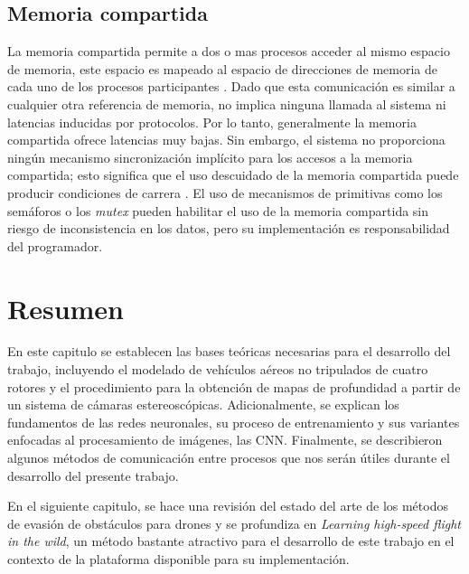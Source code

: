 \subsection{Memoria compartida}

La memoria compartida permite a dos o mas procesos acceder al mismo espacio de memoria, este espacio es mapeado al espacio de direcciones de memoria de cada uno de los procesos participantes \cite{IPCEval2015}. Dado que esta comunicación es similar a cualquier otra referencia de memoria, no implica ninguna llamada al sistema ni latencias inducidas por protocolos. Por lo tanto, generalmente la memoria compartida ofrece latencias muy bajas. Sin embargo, el sistema no proporciona ningún mecanismo sincronización implícito para los accesos a la memoria compartida; esto significa que el uso descuidado de la memoria compartida puede producir condiciones de carrera \cite{IPCEval2015}. El uso de mecanismos de primitivas como los semáforos o los \textit{mutex} pueden habilitar el uso de la memoria compartida sin riesgo de inconsistencia en los datos, pero su implementación es responsabilidad del programador.

\section{Resumen}

En este capitulo se establecen las bases teóricas necesarias para el desarrollo del trabajo, incluyendo el modelado de vehículos aéreos no tripulados de cuatro rotores y el procedimiento para la obtención de mapas de profundidad a partir de un sistema de cámaras estereoscópicas. Adicionalmente, se explican los fundamentos de las redes neuronales, su proceso de entrenamiento y sus variantes enfocadas al procesamiento de imágenes, las CNN. Finalmente, se describieron algunos métodos de comunicación entre procesos que nos serán útiles durante el desarrollo del presente trabajo.

En el siguiente capitulo, se hace una revisión del estado del arte de los métodos de evasión de obstáculos para drones y se profundiza en \textit{Learning high-speed flight in the wild}, un método bastante atractivo para el desarrollo de este trabajo en el contexto de la plataforma disponible para su implementación.